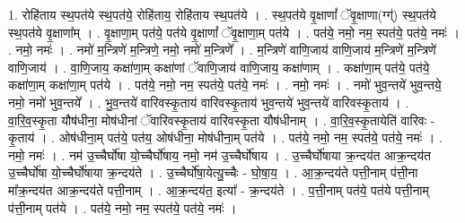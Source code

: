 \documentclass[17pt]{extarticle}
\begin{document}
1. रोहि॑ताय स्थ॒पत॑ये स्थ॒पत॑ये॒ रोहि॑ताय॒ रोहि॑ताय स्थ॒पत॑ये । . स्थ॒पत॑ये वृ॒क्षाणां᳚ ॅवृ॒क्षाणा(ग्ग्॑) स्थ॒पत॑ये स्थ॒पत॑ये वृ॒क्षाणा᳚म् । . वृ॒क्षाणा॒म् पत॑ये॒ पत॑ये वृ॒क्षाणां᳚ ॅवृ॒क्षाणा॒म् पत॑ये । . पत॑ये॒ नमो॒ नम॒ स्पत॑ये॒ पत॑ये॒ नमः॑ । . नमो॒ नमः॑ । . नमो॑ म॒न्त्रिणे॑ म॒न्त्रिणे॒ नमो॒ नमो॑ म॒न्त्रिणे᳚ । . म॒न्त्रिणे॑ वाणि॒जाय॑ वाणि॒जाय॑ म॒न्त्रिणे॑ म॒न्त्रिणे॑ वाणि॒जाय॑ । . वा॒णि॒जाय॒ कक्षा॑णा॒म् कक्षा॑णां ॅवाणि॒जाय॑ वाणि॒जाय॒ कक्षा॑णाम् । . कक्षा॑णा॒म् पत॑ये॒ पत॑ये॒ कक्षा॑णा॒म् कक्षा॑णा॒म् पत॑ये । . पत॑ये॒ नमो॒ नम॒ स्पत॑ये॒ पत॑ये॒ नमः॑ । . नमो॒ नमः॑ । . नमो॑ भुव॒न्तये॑ भुव॒न्तये॒ नमो॒ नमो॑ भुव॒न्तये᳚ । . भु॒व॒न्तये॑ वारिवस्कृ॒ताय॑ वारिवस्कृ॒ताय॑ भुव॒न्तये॑ भुव॒न्तये॑ वारिवस्कृ॒ताय॑ । . वा॒रि॒व॒स्कृ॒ता यौष॑धीना॒ मोष॑धीनां ॅवारिवस्कृ॒ताय॑ वारिवस्कृ॒ता यौष॑धीनाम् । . वा॒रि॒व॒स्कृ॒तायेति॑ वारिवः - कृ॒ताय॑ । . ओष॑धीना॒म् पत॑ये॒ पत॑य॒ ओष॑धीना॒ मोष॑धीना॒म् पत॑ये । . पत॑ये॒ नमो॒ नम॒ स्पत॑ये॒ पत॑ये॒ नमः॑ । . नमो॒ नमः॑ । . नम॑ उ॒च्चैर्घो॑षा यो॒च्चैर्घो॑षाय॒ नमो॒ नम॑ उ॒च्चैर्घो॑षाय । . उ॒च्चैर्घो॑षाया क्र॒न्दय॑त आक्र॒न्दय॑त उ॒च्चैर्घो॑षा यो॒च्चैर्घो॑षाया क्र॒न्दय॑ते । . उ॒च्चैर्घो॑षा॒येत्यु॒च्चैः - घो॒षा॒य॒ । . आ॒क्र॒न्दय॑ते पत्ती॒नाम् प॑त्ती॒ना मा᳚क्र॒न्दय॑त आक्र॒न्दय॑ते पत्ती॒नाम् । . आ॒क्र॒न्दय॑त॒ इत्या᳚ - क्र॒न्दय॑ते । . प॒त्ती॒नाम् पत॑ये॒ पत॑ये पत्ती॒नाम् प॑त्ती॒नाम् पत॑ये । . पत॑ये॒ नमो॒ नम॒ स्पत॑ये॒ पत॑ये॒ नमः॑ । \newline
\end{document}
